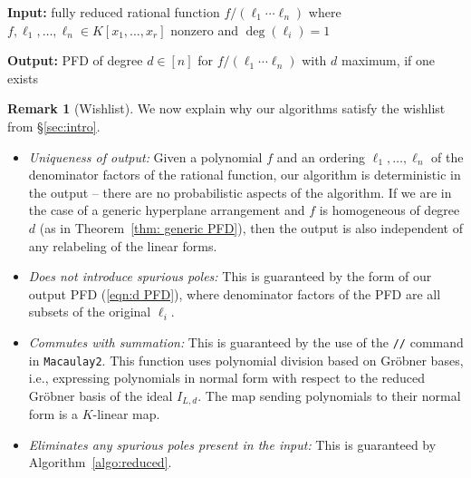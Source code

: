 \documentclass [a4paper,reqno, 11pt]{amsart}
\theoremstyle{plain}
\theoremstyle{plain}
\theoremstyle{plain}
\theoremstyle{plain}
\theoremstyle{definition}
\theoremstyle{definition}
\theoremstyle{definition}
\newtheorem{remark}[theorem]{Remark}
\theoremstyle{definition}
\theoremstyle{definition}
\theoremstyle{definition}
\begin{document}
\begin{algorithm}
	\caption{\texttt{PFD}}
	\label{algo:PFD}
	\begin{flushleft}
		\textbf{Input:} fully reduced rational function $f/(\ell_1\cdots\ell_n)$ where $f,\ell_1,\ldots,\ell_n\in K[x_1,\ldots,x_r]$ nonzero and $\deg(\ell_i)=1$
		
		\textbf{Output:} PFD of degree $d\in[n]$ for $f/(\ell_1\cdots\ell_n)$ with $d$ maximum, if one exists
	\end{flushleft}
	\begin{algorithmic}[1]
        
        \ELSE
        \ENDIF
        \ENDFOR
        \ELSE
        \ENDIF
	\end{algorithmic}
\end{algorithm}
\newpage
\begin{remark}[Wishlist]
    We now explain why our algorithms satisfy the wishlist from \S\ref{sec:intro}.
\begin{itemize}
    \item[\ref{wishlist(i)}] \emph{Uniqueness of output:} Given a polynomial $f$ and an ordering $\ell_1,\ldots,\ell_n$ of the denominator factors of the rational function, our algorithm is deterministic in the output -- there are no probabilistic aspects of the algorithm. If we are in the case of a generic hyperplane arrangement and $f$ is homogeneous of degree $d$ (as in Theorem~\ref{thm: generic PFD}), then the output is also independent of any relabeling of the linear forms.
    \item[\ref{wishlist(ii)}] \emph{Does not introduce spurious poles:} This is guaranteed by the form of our output PFD (\ref{eqn:d PFD}), where denominator factors of the PFD are all subsets of the original $\ell_i$.
    \item[\ref{wishlist(iii)}] \emph{Commutes with summation:} This is guaranteed by the use of the \texttt{//} command in \texttt{Macaulay2}. This function uses polynomial division based on Gr\"obner bases, i.e., expressing polynomials in normal form with respect to the reduced Gr\"obner basis of the ideal $I_{L,d}$. The map sending polynomials to their normal form is a $K$-linear map.
    \item[\ref{wishlist(iv)}] \emph{Eliminates any spurious poles present in the input:} This is guaranteed by Algorithm~\ref{algo:reduced}.
\end{itemize}
\end{remark}
\end{document}

